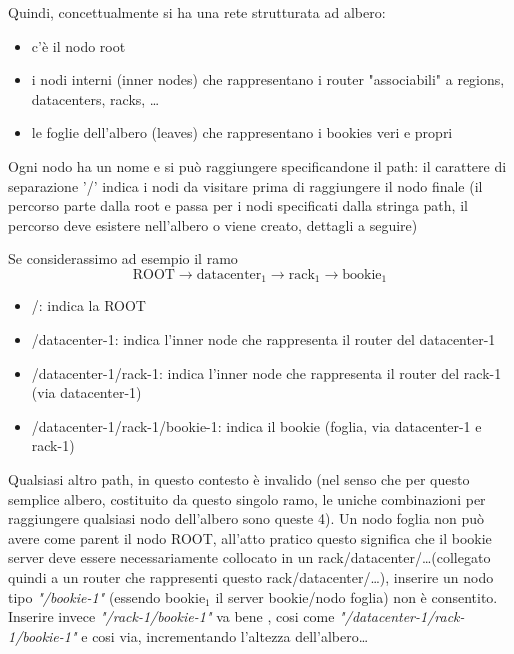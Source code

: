 \documentclass[10pt, a4paper]{article}
\begin{document}
	Quindi, concettualmente si ha una rete strutturata ad albero: 
	\begin{itemize}
		\item c'è il nodo root
		\item i nodi interni (inner nodes) che rappresentano i router "associabili" a regions, datacenters, racks, \dots
		\item le foglie dell'albero (leaves) che rappresentano i bookies veri e propri
	\end{itemize}

	Ogni nodo ha un nome e si può raggiungere specificandone il path: il carattere di separazione '/' indica i nodi da visitare prima
	di raggiungere il nodo finale (il percorso parte dalla root e passa per i nodi specificati dalla stringa path, il percorso deve esistere nell'albero o viene creato, dettagli a seguire)

	Se considerassimo ad esempio il ramo 
	$$ \text{ROOT} \rightarrow \text{datacenter}_1 \rightarrow \text{rack}_1 \rightarrow \text{bookie}_1$$

	\begin{itemize}	
		\item /: indica la ROOT
		\item /datacenter-1: indica l'inner node che rappresenta il router del datacenter-1
		\item /datacenter-1/rack-1: indica l'inner node che rappresenta il router del rack-1 (via datacenter-1)
		\item /datacenter-1/rack-1/bookie-1: indica il bookie (foglia, via datacenter-1 e rack-1)
	\end{itemize}
	
	Qualsiasi altro path, in questo contesto è invalido (nel senso che per questo semplice albero, costituito da questo singolo ramo,
	le uniche combinazioni per raggiungere qualsiasi nodo dell'albero sono queste 4).
	Un nodo foglia non può avere come parent il nodo ROOT, all'atto pratico questo significa che il bookie server deve essere necessariamente
	collocato in un rack/datacenter/\dots (collegato quindi a un router che rappresenti questo rack/datacenter/\dots), inserire un nodo tipo
	\textit{"/bookie-1"} (essendo bookie$_1$ il server bookie/nodo foglia) non è consentito. Inserire invece \textit{"/rack-1/bookie-1"} va bene
	, cosi come \textit{"/datacenter-1/rack-1/bookie-1"} e cosi via, incrementando l'altezza dell'albero\dots
\end{document}
